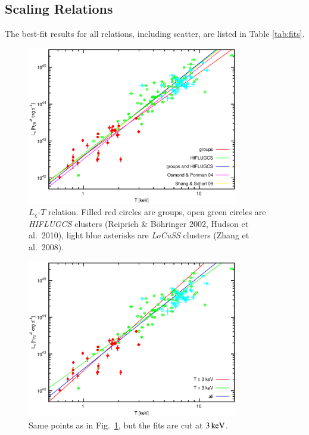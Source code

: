 \documentclass[structabstract]{aa}
\begin{document}
\subsection{Scaling Relations}\label{sec:results:scaling}
The best-fit results for all relations, including scatter, are listed
in Table \ref{tab:fits}.
   \begin{figure}
   \centering
   \includegraphics[width=0.82\textwidth]{lthdahifl_c.eps}
   \caption{$L_{\text{x}}$-$T$ relation. Filled red circles are
     groups, open green circles are \emph{HIFLUGCS} clusters (Reiprich \&
     B\"ohringer 2002, Hudson et al.\ 2010), light blue asterisks are
     \emph{LoCuSS} clusters (Zhang et al.\ 2008).}
              \label{fig:ltrelation}%
    \end{figure}
   \begin{figure}
   \centering
   \includegraphics[width=0.82\textwidth]{lthdahifl3k_c.eps}
   \caption{Same points as in Fig.\ \ref{fig:ltrelation},
     but the fits are cut at $\unit[3]{keV}$.}
              \label{fig:lt3krelation}%
    \end{figure}
\end{document}
